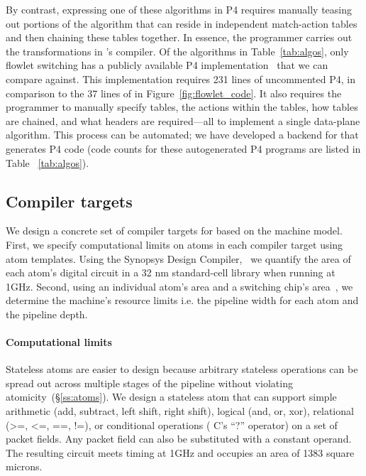 By contrast, expressing one of these algorithms in P4 requires manually teasing
out portions of the algorithm that can reside in independent match-action
tables and then chaining these tables together. In essence, the programmer
carries out the transformations in \pktlanguage's compiler. Of the algorithms
in Table~\ref{tab:algos}, only flowlet switching has a publicly available P4
implementation~\cite{p4_flowlet} that we can compare against. This
implementation requires 231 lines of uncommented P4, in comparison to the 37
lines of \pktlanguage in Figure~\ref{fig:flowlet_code}. It also requires the
programmer to manually specify tables, the actions within the tables, how
tables are chained, and what headers are required---all to implement a single
data-plane algorithm. This process can be automated; we have developed a
backend for \pktlanguage that generates P4 code (code counts for these
autogenerated P4 programs are listed in Table ~\ref{tab:algos}).

\subsection{Compiler targets}
\label{ss:targets}

We design a concrete set of compiler targets for \pktlanguage based on the
\absmachine machine model. First, we specify computational limits on atoms in
each compiler target using atom templates. Using the Synopsys Design
Compiler,~\cite{synopsys_dc} we quantify the area of each atom's digital
circuit in a 32 nm standard-cell library when running at 1GHz.  Second, using
an individual atom's area and a switching chip's area~\cite{gibb_parsing}, we
determine the machine's resource limits i.e. the pipeline width for each atom
and the pipeline depth.

\paragraph{Computational limits}
Stateless atoms are easier to design because arbitrary stateless operations can
be spread out across multiple stages of the pipeline without violating
atomicity~(\S\ref{ss:atoms}). We design a stateless atom that can support
simple arithmetic (add, subtract, left shift, right shift), logical (and, or,
xor), relational (>=, <=, ==, !=), or conditional operations ( C's ``?''
operator) on a set of packet fields. Any packet field can also be substituted
with a constant operand. The resulting circuit meets timing at 1GHz and
occupies an area of 1383 square microns.

